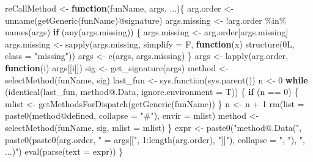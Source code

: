 \documentclass[
]{article}
\newenvironment{Shaded}{\begin{snugshade}}{\end{snugshade}}
\newcommand{\AttributeTok}[1]{\textcolor[rgb]{0.77,0.63,0.00}{#1}}
\newcommand{\ControlFlowTok}[1]{\textcolor[rgb]{0.13,0.29,0.53}{\textbf{#1}}}
\newcommand{\DecValTok}[1]{\textcolor[rgb]{0.00,0.00,0.81}{#1}}
\newcommand{\FunctionTok}[1]{\textcolor[rgb]{0.00,0.00,0.00}{#1}}
\newcommand{\NormalTok}[1]{#1}
\newcommand{\OtherTok}[1]{\textcolor[rgb]{0.56,0.35,0.01}{#1}}
\newcommand{\SpecialCharTok}[1]{\textcolor[rgb]{0.00,0.00,0.00}{#1}}
\newcommand{\StringTok}[1]{\textcolor[rgb]{0.31,0.60,0.02}{#1}}
\begin{document}
\begin{Shaded}
\begin{Highlighting}[]
\NormalTok{reCallMethod }\OtherTok{\textless{}{-}} 
  \ControlFlowTok{function}\NormalTok{(funName, args, ...)\{}
\NormalTok{    arg.order }\OtherTok{\textless{}{-}} \FunctionTok{unname}\NormalTok{(}\FunctionTok{getGeneric}\NormalTok{(funName)}\SpecialCharTok{@}\NormalTok{signature)}
\NormalTok{    args.missing }\OtherTok{\textless{}{-}} \SpecialCharTok{!}\NormalTok{arg.order }\SpecialCharTok{\%in\%} \FunctionTok{names}\NormalTok{(args)}
    \ControlFlowTok{if}\NormalTok{ (}\FunctionTok{any}\NormalTok{(args.missing)) \{}
\NormalTok{      args.missing }\OtherTok{\textless{}{-}}\NormalTok{ arg.order[args.missing]}
\NormalTok{      args.missing }\OtherTok{\textless{}{-}} \FunctionTok{sapply}\NormalTok{(args.missing, }\AttributeTok{simplify =}\NormalTok{ F,}
                             \ControlFlowTok{function}\NormalTok{(x) }\FunctionTok{structure}\NormalTok{(0L, }\AttributeTok{class =} \StringTok{"missing"}\NormalTok{))}
\NormalTok{      args }\OtherTok{\textless{}{-}} \FunctionTok{c}\NormalTok{(args, args.missing)}
\NormalTok{    \}}
\NormalTok{    args }\OtherTok{\textless{}{-}} \FunctionTok{lapply}\NormalTok{(arg.order, }\ControlFlowTok{function}\NormalTok{(i) args[[i]])}
\NormalTok{    sig }\OtherTok{\textless{}{-}} \FunctionTok{get\_signature}\NormalTok{(args)}
\NormalTok{    method }\OtherTok{\textless{}{-}} \FunctionTok{selectMethod}\NormalTok{(funName, sig)}
\NormalTok{    last\_fun }\OtherTok{\textless{}{-}} \FunctionTok{sys.function}\NormalTok{(}\FunctionTok{sys.parent}\NormalTok{())}
\NormalTok{    n }\OtherTok{\textless{}{-}} \DecValTok{0}
    \ControlFlowTok{while}\NormalTok{ (}\FunctionTok{identical}\NormalTok{(last\_fun, method}\SpecialCharTok{@}\NormalTok{.Data, }\AttributeTok{ignore.environment =}\NormalTok{ T)) \{}
      \ControlFlowTok{if}\NormalTok{ (n }\SpecialCharTok{==} \DecValTok{0}\NormalTok{) \{}
\NormalTok{        mlist }\OtherTok{\textless{}{-}} \FunctionTok{getMethodsForDispatch}\NormalTok{(}\FunctionTok{getGeneric}\NormalTok{(funName))}
\NormalTok{      \}}
\NormalTok{      n }\OtherTok{\textless{}{-}}\NormalTok{ n }\SpecialCharTok{+} \DecValTok{1}
      \FunctionTok{rm}\NormalTok{(}\AttributeTok{list =} \FunctionTok{paste0}\NormalTok{(method}\SpecialCharTok{@}\NormalTok{defined, }\AttributeTok{collapse =} \StringTok{"\#"}\NormalTok{), }\AttributeTok{envir =}\NormalTok{ mlist)}
\NormalTok{      method }\OtherTok{\textless{}{-}} \FunctionTok{selectMethod}\NormalTok{(funName, sig, }\AttributeTok{mlist =}\NormalTok{ mlist)}
\NormalTok{    \}}
\NormalTok{    expr }\OtherTok{\textless{}{-}} \FunctionTok{paste0}\NormalTok{(}\StringTok{"method@.Data("}\NormalTok{,}
                   \FunctionTok{paste0}\NormalTok{(}\FunctionTok{paste0}\NormalTok{(arg.order, }\StringTok{" = args[["}\NormalTok{,}
                                 \DecValTok{1}\SpecialCharTok{:}\FunctionTok{length}\NormalTok{(arg.order), }\StringTok{"]]"}\NormalTok{),}
                          \AttributeTok{collapse =} \StringTok{", "}\NormalTok{),}
                   \StringTok{", ...)"}\NormalTok{)}
    \FunctionTok{eval}\NormalTok{(}\FunctionTok{parse}\NormalTok{(}\AttributeTok{text =}\NormalTok{ expr))}
\NormalTok{  \}}


\end{Highlighting}
\end{Shaded}
\end{document}
